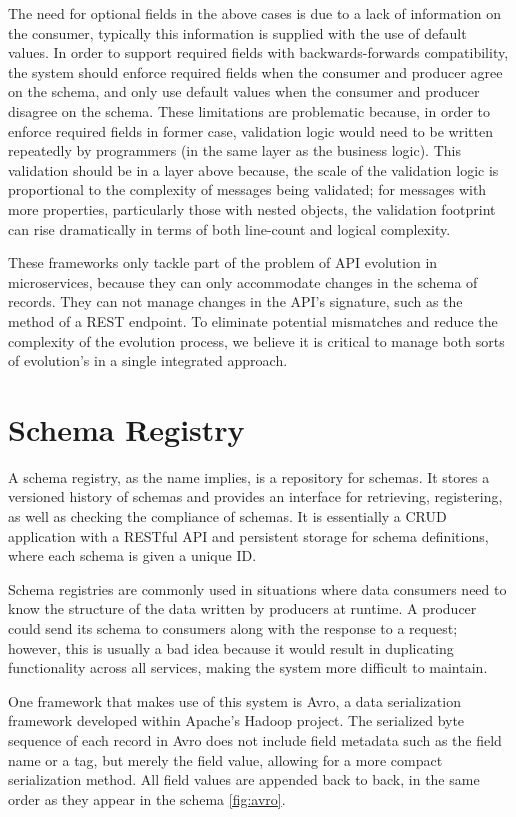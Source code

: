 The need for optional fields in the above cases is due to a lack of information on the consumer, typically this information is supplied with the use of default values.
In order to support required fields with backwards-forwards compatibility, the system should enforce required fields when the consumer and producer agree on the schema,
and only use default values when the consumer and producer disagree on the schema.
These limitations are problematic because, in order to enforce required fields in former case,
validation logic would need to be written repeatedly by programmers (in the same layer as the business logic).
This validation should be in a layer above because, the scale of the validation logic is proportional to the complexity of messages being validated;
for messages with more properties, particularly those with nested objects, the validation footprint can rise dramatically in terms of both line-count and logical complexity.

These frameworks only tackle part of the problem of API evolution in microservices,
because they can only accommodate changes in the schema of records.
They can not manage changes in the API's signature, such as the method of a REST endpoint.
To eliminate potential mismatches and reduce the complexity of the evolution process, we believe it is critical to manage both sorts of evolution's in a single integrated approach.

\section{Schema Registry} %
\label{sec:schema_registry}

A schema registry, as the name implies, is a repository for schemas.
It stores a versioned history of schemas and provides an interface for retrieving, registering, as well as checking the compliance of schemas.
It is essentially a CRUD application with a RESTful API and persistent storage for schema definitions, where each schema is given a unique ID.

Schema registries are commonly used in situations where data consumers need to know the structure of the data written by producers at runtime.
A producer could send its schema to consumers along with the response to a request;
however, this is usually a bad idea because it would result in duplicating functionality across all services, making the system more difficult to maintain.

One framework that makes use of this system is Avro, a data serialization framework developed within Apache's Hadoop project.
The serialized byte sequence of each record in Avro does not include field metadata such as the field name or a tag, but merely the field value, allowing for a more compact serialization method.
All field values are appended back to back, in the same order as they appear in the schema \ref{fig:avro}.

